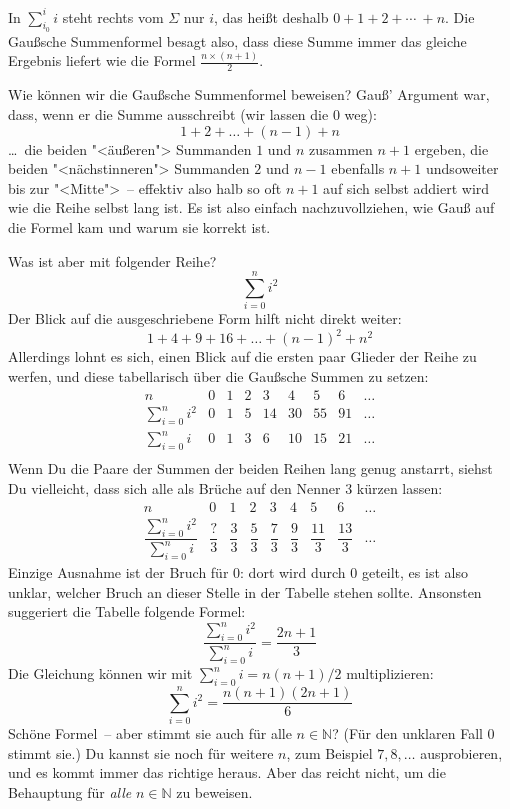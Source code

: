 In $\sum_{i_0}^i i$ steht rechts vom $\Sigma$ nur $i$, das heißt
deshalb $0 + 1 + 2 + \cdots \ + n$.  Die Gaußsche Summenformel besagt
also, dass diese Summe immer das gleiche Ergebnis liefert wie die
Formel $\frac{n\times (n+1)}{2}$.

Wie können wir die Gaußsche Summenformel beweisen?  Gauß' Argument war, dass,
wenn er die Summe ausschreibt (wir lassen die $0$ weg):
%
\[ 1+2+\ldots+(n-1) + n \]
%
\ldots~die beiden "<äußeren"> Summanden $1$ und $n$ zusammen $n+1$
ergeben, die beiden "<nächstinneren"> Summanden $2$ und $n-1$
ebenfalls $n+1$ undsoweiter bis zur "<Mitte">~-- effektiv also halb so
oft $n+1$ auf sich selbst addiert wird wie die Reihe selbst lang ist.
Es ist also einfach nachzuvollziehen, wie Gauß auf die Formel kam und
warum sie korrekt ist.

Was ist aber mit folgender Reihe?
%
\[ \sum_{i=0}^n i^2 \]
%
Der Blick auf die ausgeschriebene Form hilft nicht direkt weiter:
%
\[ 1+4+9+16+\ldots+(n-1)^2+n^2 \]
%
Allerdings lohnt es sich, einen Blick auf die ersten paar Glieder der
Reihe zu werfen, und diese tabellarisch über die Gaußsche Summen zu
setzen:
%
\begin{displaymath}
  \begin{array}{crrrrrrrr}
    n & 0 & 1 & 2 & 3 & 4 & 5 & 6 & \ldots\\\hline
    \sum_{i=0}^n i^2 & 0 & 1 & 5 & 14 & 30 & 55 & 91 & \ldots\\
    \sum_{i=0}^n i   & 0 & 1 & 3 & 6 & 10 & 15 & 21 & \ldots\\
  \end{array}
\end{displaymath}
%
Wenn Du die Paare der Summen der beiden Reihen lang genug anstarrt, siehst
Du vielleicht, dass sich alle als Brüche auf den Nenner $3$ kürzen lassen:
%
\begin{displaymath}
  \begin{array}{crrrrrrrr}
    n & 0 & 1 & 2 & 3 & 4 & 5 & 6 & \ldots\\\hline
    \dfrac{\sum_{i=0}^n i^2}{\sum_{i=0}^n i} & \dfrac{?}{3} & \dfrac{3}{3} &
    \dfrac{5}{3} & \dfrac{7}{3} & \dfrac{9}{3} & \dfrac{11}{3} & \dfrac{13}{3} & \ldots
  \end{array}
\end{displaymath}
%
Einzige Ausnahme ist der Bruch für $0$: dort wird durch $0$ geteilt, es
ist also unklar, welcher Bruch an dieser Stelle in der Tabelle stehen
sollte.  Ansonsten suggeriert die Tabelle folgende Formel:
%
\begin{displaymath}
  \dfrac{\sum_{i=0}^n i^2}{\sum_{i=0}^n i} = \dfrac{2n+1}{3}
\end{displaymath}
%
Die Gleichung können wir mit $\sum_{i=0}^n i = n(n+1)/2$ multiplizieren:
%
\begin{equation}
  \sum_{i=0}^n i^2 = \dfrac{n(n+1)(2n+1)}{6}
  \label{eq:squares-induction-prequel}
\end{equation}
%
Schöne Formel~-- aber stimmt sie auch für alle $n\in\mathbb{N}$?  (Für
den unklaren Fall $0$ stimmt sie.)  
Du kannst sie noch für weitere $n$, zum Beispiel $7, 8, \ldots$ ausprobieren,
und es kommt immer das richtige heraus.  Aber das
reicht nicht, um die Behauptung
für \emph{alle} $n\in\mathbb{N}$ zu beweisen.

